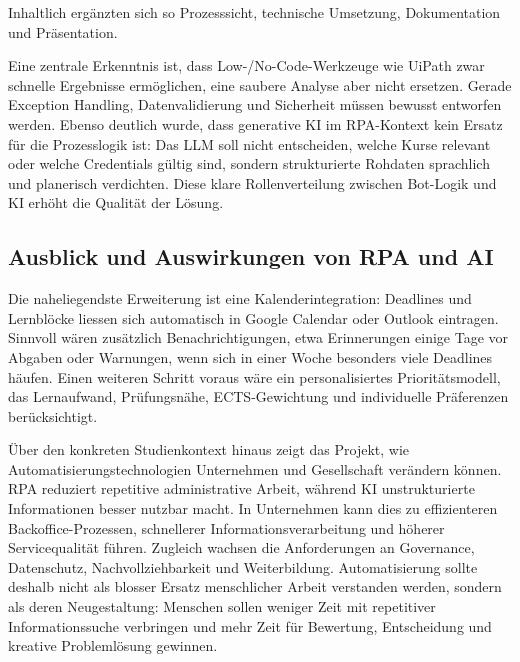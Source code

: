 \documentclass[11pt]{scrartcl}
\begin{document}
Inhaltlich ergänzten sich so Prozesssicht, technische Umsetzung, Dokumentation und Präsentation.

Eine zentrale Erkenntnis ist, dass Low-/No-Code-Werkzeuge wie UiPath zwar schnelle Ergebnisse ermöglichen, eine saubere Analyse aber nicht ersetzen. Gerade Exception Handling, Datenvalidierung und Sicherheit müssen bewusst entworfen werden. Ebenso deutlich wurde, dass generative KI im RPA-Kontext kein Ersatz für die Prozesslogik ist: Das LLM soll nicht entscheiden, welche Kurse relevant oder welche Credentials gültig sind, sondern strukturierte Rohdaten sprachlich und planerisch verdichten. Diese klare Rollenverteilung zwischen Bot-Logik und KI erhöht die Qualität der Lösung.

\subsection{Ausblick und Auswirkungen von RPA und AI}
Die naheliegendste Erweiterung ist eine Kalenderintegration: Deadlines und Lernblöcke liessen sich automatisch in Google Calendar oder Outlook eintragen. Sinnvoll wären zusätzlich Benachrichtigungen, etwa Erinnerungen einige Tage vor Abgaben oder Warnungen, wenn sich in einer Woche besonders viele Deadlines häufen. Einen weiteren Schritt voraus wäre ein personalisiertes Prioritätsmodell, das Lernaufwand, Prüfungsnähe, ECTS-Gewichtung und individuelle Präferenzen berücksichtigt.

Über den konkreten Studienkontext hinaus zeigt das Projekt, wie Automatisierungstechnologien Unternehmen und Gesellschaft verändern können. RPA reduziert repetitive administrative Arbeit, während KI unstrukturierte Informationen besser nutzbar macht. In Unternehmen kann dies zu effizienteren Backoffice-Prozessen, schnellerer Informationsverarbeitung und höherer Servicequalität führen. Zugleich wachsen die Anforderungen an Governance, Datenschutz, Nachvollziehbarkeit und Weiterbildung. Automatisierung sollte deshalb nicht als blosser Ersatz menschlicher Arbeit verstanden werden, sondern als deren Neugestaltung: Menschen sollen weniger Zeit mit repetitiver Informationssuche verbringen und mehr Zeit für Bewertung, Entscheidung und kreative Problemlösung gewinnen.
\end{document}
